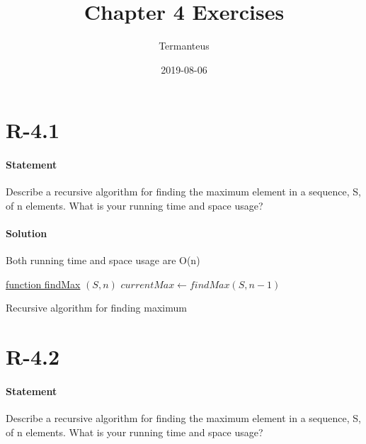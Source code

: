 \documentclass{article}
\title{Chapter 4 Exercises}
\date{2019-08-06}
\author{Termanteus}
\begin{document}
\maketitle
{}
\newpage
{}
\tableofcontents
\newpage \section{R-4.1}
\paragraph{Statement}
Describe a recursive algorithm for finding the maximum element in a sequence, S, of n elements. What is your running time and space usage?
\paragraph{Solution}
  Both running time and space usage are O(n)
  \begin{algorithm}[h!]
    
    \underline{function findMax} $(S,n)$\;
      $currentMax \longleftarrow findMax(S,n-1)$\;
    \caption{Recursive algorithm for finding maximum}
  \end{algorithm}
\newpage \section{R-4.2}
\paragraph{Statement}
Describe a recursive algorithm for finding the maximum element in a sequence, S, of n elements. What is your running time and space usage?
\end{document}
